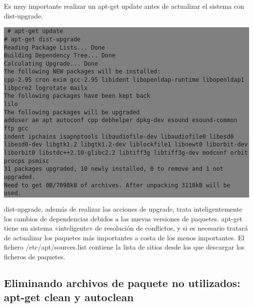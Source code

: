 \documentclass[12pt]{article}
\begin{document}
Es muy importante realizar un apt-get update antes de actualizar el sistema con dist-upgrade.

\colorbox{grey}{\parbox[t]{0.95\linewidth}{ \vspace*{0.5cm} {\tt
     \# apt-get update\\
     \# apt-get dist-upgrade\\
     Reading Package Lists... Done\\
     Building Dependency Tree... Done\\
     Calculating Upgrade... Done\\
     The following NEW packages will be installed:\\
       cpp-2.95 cron exim gcc-2.95 libident libopenldap-runtime libopenldap1\\
       libpcre2 logrotate mailx\\
     The following packages have been kept back\\
       lilo\\
     The following packages will be upgraded\\
       adduser ae apt autoconf cpp debhelper dpkg-dev esound esound-common ftp gcc\\
       indent ipchains isapnptools libaudiofile-dev libaudiofile0 libesd0\\
       libesd0-dev libgtk1.2 libgtk1.2-dev liblockfile1 libnewt0 liborbit-dev\\
       liborbit0 libstdc++2.10-glibc2.2 libtiff3g libtiff3g-dev modconf orbit\\
       procps psmisc\\
     31 packages upgraded, 10 newly installed, 0 to remove and 1 not upgraded.\\
     Need to get 0B/7098kB of archives. After unpacking 3118kB will be used.\\
 } \vspace*{0.5cm} } } 

           dist-upgrade, además de realizar las acciones de upgrade, trata
           inteligentemente los cambios de dependencias debidos a las nuevas
           versiones de paquetes.  apt-get tiene un sistema «inteligente» de
           resolución de conflictos, y si es necesario tratará de actualizar
           los paquetes más importantes a costa de los menos importantes. El
           fichero /etc/apt/sources.list contiene la lista de sitios desde los
           que descargar los ficheros de paquetes. 

\subsection*{Eliminando archivos de paquete no utilizados: apt-get clean y autoclean}
\end{document}
